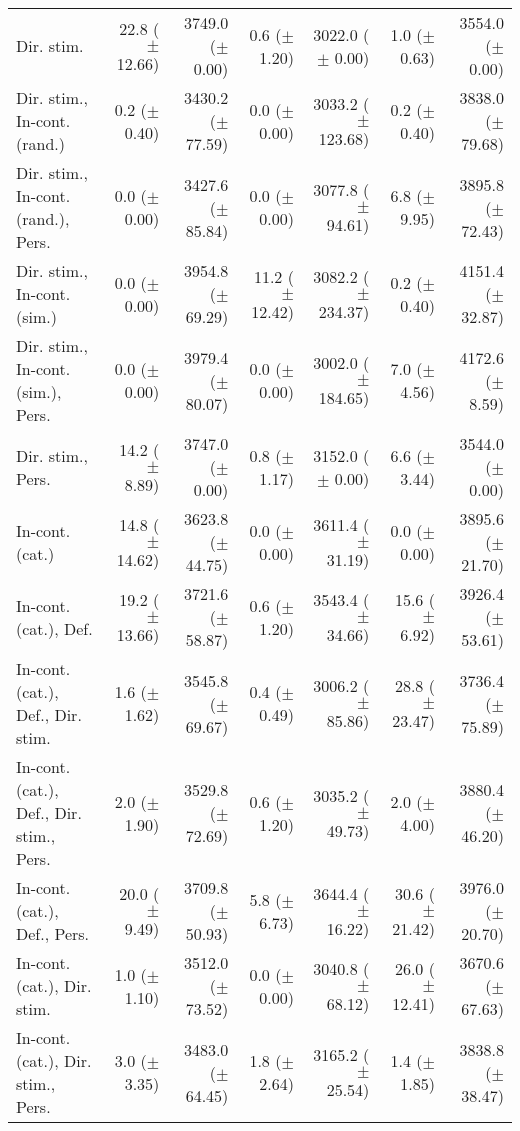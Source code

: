 \begin{table*}
\begin{tabular}{lrrrrrr}
        Dir. stim. & 22.8 ($\pm$ 12.66) & 3749.0 ($\pm$ 0.00) & 0.6 ($\pm$ 1.20) & 3022.0 ($\pm$ 0.00) & 1.0 ($\pm$ 0.63) & 3554.0 ($\pm$ 0.00) \\
        Dir. stim., In-cont. (rand.) & 0.2 ($\pm$ 0.40) & 3430.2 ($\pm$ 77.59) & 0.0 ($\pm$ 0.00) & 3033.2 ($\pm$ 123.68) & 0.2 ($\pm$ 0.40) & 3838.0 ($\pm$ 79.68) \\
        Dir. stim., In-cont. (rand.), Pers. & 0.0 ($\pm$ 0.00) & 3427.6 ($\pm$ 85.84) & 0.0 ($\pm$ 0.00) & 3077.8 ($\pm$ 94.61) & 6.8 ($\pm$ 9.95) & 3895.8 ($\pm$ 72.43) \\
        Dir. stim., In-cont. (sim.) & 0.0 ($\pm$ 0.00) & 3954.8 ($\pm$ 69.29) & 11.2 ($\pm$ 12.42) & 3082.2 ($\pm$ 234.37) & 0.2 ($\pm$ 0.40) & 4151.4 ($\pm$ 32.87) \\
        Dir. stim., In-cont. (sim.), Pers. & 0.0 ($\pm$ 0.00) & 3979.4 ($\pm$ 80.07) & 0.0 ($\pm$ 0.00) & 3002.0 ($\pm$ 184.65) & 7.0 ($\pm$ 4.56) & 4172.6 ($\pm$ 8.59) \\
        Dir. stim., Pers. & 14.2 ($\pm$ 8.89) & 3747.0 ($\pm$ 0.00) & 0.8 ($\pm$ 1.17) & 3152.0 ($\pm$ 0.00) & 6.6 ($\pm$ 3.44) & 3544.0 ($\pm$ 0.00) \\
        In-cont. (cat.) & 14.8 ($\pm$ 14.62) & 3623.8 ($\pm$ 44.75) & 0.0 ($\pm$ 0.00) & 3611.4 ($\pm$ 31.19) & 0.0 ($\pm$ 0.00) & 3895.6 ($\pm$ 21.70) \\
        In-cont. (cat.), Def. & 19.2 ($\pm$ 13.66) & 3721.6 ($\pm$ 58.87) & 0.6 ($\pm$ 1.20) & 3543.4 ($\pm$ 34.66) & 15.6 ($\pm$ 6.92) & 3926.4 ($\pm$ 53.61) \\
        In-cont. (cat.), Def., Dir. stim. & 1.6 ($\pm$ 1.62) & 3545.8 ($\pm$ 69.67) & 0.4 ($\pm$ 0.49) & 3006.2 ($\pm$ 85.86) & 28.8 ($\pm$ 23.47) & 3736.4 ($\pm$ 75.89) \\
        In-cont. (cat.), Def., Dir. stim., Pers. & 2.0 ($\pm$ 1.90) & 3529.8 ($\pm$ 72.69) & 0.6 ($\pm$ 1.20) & 3035.2 ($\pm$ 49.73) & 2.0 ($\pm$ 4.00) & 3880.4 ($\pm$ 46.20) \\
        In-cont. (cat.), Def., Pers. & 20.0 ($\pm$ 9.49) & 3709.8 ($\pm$ 50.93) & 5.8 ($\pm$ 6.73) & 3644.4 ($\pm$ 16.22) & 30.6 ($\pm$ 21.42) & 3976.0 ($\pm$ 20.70) \\
        In-cont. (cat.), Dir. stim. & 1.0 ($\pm$ 1.10) & 3512.0 ($\pm$ 73.52) & 0.0 ($\pm$ 0.00) & 3040.8 ($\pm$ 68.12) & 26.0 ($\pm$ 12.41) & 3670.6 ($\pm$ 67.63) \\
        In-cont. (cat.), Dir. stim., Pers. & 3.0 ($\pm$ 3.35) & 3483.0 ($\pm$ 64.45) & 1.8 ($\pm$ 2.64) & 3165.2 ($\pm$ 25.54) & 1.4 ($\pm$ 1.85) & 3838.8 ($\pm$ 38.47) \\

\end{tabular}
\end{table*}
